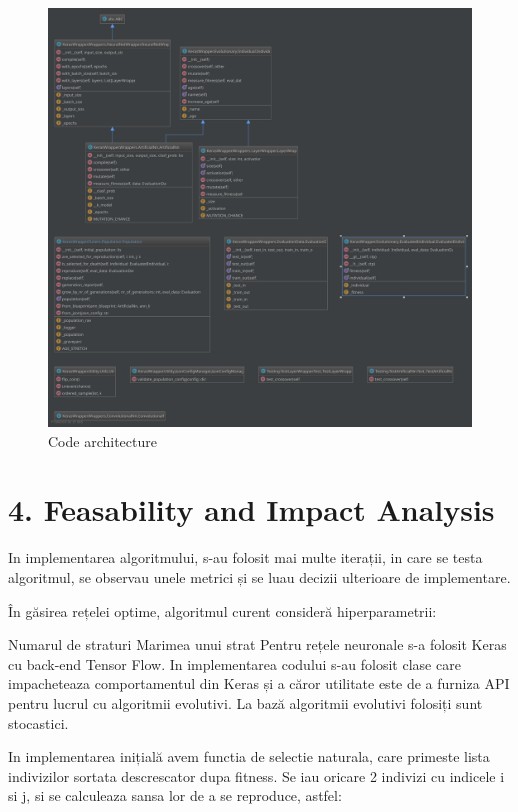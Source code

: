 \documentclass[11pt]{article}
\makeatletter
\def\maxwidth{\ifdim\Gin@nat@width>\linewidth\linewidth
    \else\Gin@nat@width\fi}
\let\Oldincludegraphics\includegraphics
\renewcommand{\includegraphics}[1]{\Oldincludegraphics[width=.8\maxwidth]{#1}}
\makeatother
\begin{document}
\begin{figure}
\centering
\includegraphics{gfx/BachelorThesis.svg}
\caption{Code architecture}
\end{figure}

    \hypertarget{feasability-and-impact-analysis}{%
\section{4. Feasability and Impact
Analysis}\label{feasability-and-impact-analysis}}

In implementarea algoritmului, s-au folosit mai multe iterații, in care
se testa algoritmul, se observau unele metrici și se luau decizii
ulterioare de implementare.

În găsirea rețelei optime, algoritmul curent consideră hiperparametrii:

Numarul de straturi Marimea unui strat Pentru rețele neuronale s-a
folosit Keras cu back-end Tensor Flow. In implementarea codului s-au
folosit clase care impacheteaza comportamentul din Keras și a căror
utilitate este de a furniza API pentru lucrul cu algoritmii evolutivi.
La bază algoritmii evolutivi folosiți sunt stocastici.

In implementarea inițială avem functia de selectie naturala, care
primeste lista indivizilor sortata descrescator dupa fitness. Se iau
oricare 2 indivizi cu indicele i si j, si se calculeaza sansa lor de a
se reproduce, astfel:
\end{document}
